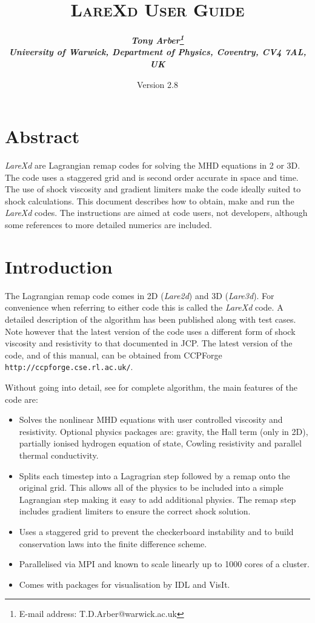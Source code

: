 \documentclass[11pt]{article}
\begin{document}
\title{
\bfseries\scshape LareXd User Guide}
\author{\bfseries\itshape Tony Arber\thanks{E-mail address: T.D.Arber@warwick.ac.uk}\\
University of Warwick, Department of Physics, Coventry, CV4 7AL, UK}
\date{Version 2.8}
\maketitle

\thispagestyle{empty}

\section*{Abstract}
{\it LareXd} are Lagrangian remap codes for solving the MHD equations in 2 or 3D. The code uses a staggered grid and is second order accurate in space and time. The use of shock viscosity and gradient limiters make the code ideally suited to shock calculations. This document describes how to obtain, make and run the {\it LareXd}  codes. The instructions are aimed at code users, not developers, although some references to more detailed numerics are included.


\section{Introduction}
The Lagrangian remap code comes in 2D ({\it Lare2d}) and 3D ({\it Lare3d}). For convenience when referring to either code this is called the {\it LareXd} code. A detailed description of the algorithm has been published \cite{jcp} along with test cases. Note however that the latest version of the code uses a different form of shock viscosity and resistivity to that documented in JCP. The latest version of the code, and of this manual, can be obtained from CCPForge {\tt http://ccpforge.cse.rl.ac.uk/}. 

Without going into detail, see \cite{jcp} for complete algorithm, the main features of the code are:
\begin{itemize}
 \item Solves the nonlinear MHD equations with user controlled viscosity and resistivity. Optional physics packages are: gravity, the Hall term (only in 2D), partially ionised hydrogen equation of state, Cowling resistivity and parallel thermal conductivity.
 \item Splits each timestep into a Lagragrian step followed by a remap onto the original grid. This allows all of the physics to be included into a simple Lagrangian step making it easy to add additional physics. The remap step includes gradient limiters to ensure the correct shock solution.
 \item Uses a staggered grid to prevent the checkerboard instability and to build conservation laws into the finite difference scheme.
 \item Parallelised via MPI and known to scale linearly up to 1000 cores of a cluster.
 \item Comes with packages for visualisation by IDL and VisIt. \cite{visit}
\end{itemize}
\end{document}
